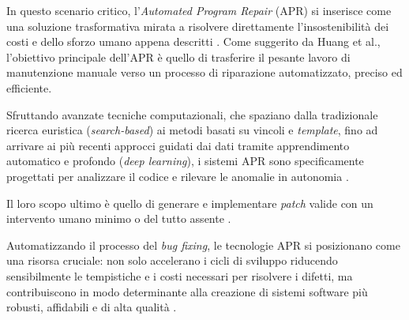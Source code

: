 In questo scenario critico, l'\textit{Automated Program Repair} (APR) si inserisce come una soluzione trasformativa mirata a risolvere direttamente 
l'insostenibilità dei costi e dello sforzo umano appena descritti \cite{dikici2025advancements}.
Come suggerito da Huang et al., l'obiettivo principale dell'APR è quello di trasferire il pesante lavoro di manutenzione manuale verso un 
processo di riparazione automatizzato, preciso ed efficiente. 

Sfruttando avanzate tecniche computazionali, che spaziano dalla tradizionale ricerca euristica (\textit{search-based}) ai metodi basati su vincoli e 
\textit{template}, fino ad arrivare ai più recenti approcci guidati dai dati tramite apprendimento automatico e profondo (\textit{deep learning}), i sistemi APR 
sono specificamente progettati per analizzare il codice e rilevare le anomalie in autonomia \cite{huang2024evolving,dikici2025advancements}.

Il loro scopo ultimo è quello di generare e implementare \textit{patch} valide con un intervento umano minimo o del tutto assente \cite{dikici2025advancements}.

Automatizzando il processo del \textit{bug fixing}, le tecnologie APR si posizionano come una risorsa cruciale: non solo accelerano i cicli di 
sviluppo riducendo sensibilmente le tempistiche e i costi necessari per risolvere i difetti, ma contribuiscono in modo determinante alla 
creazione di sistemi software più robusti, affidabili e di alta qualità \cite{dikici2025advancements,le2016towards}.

